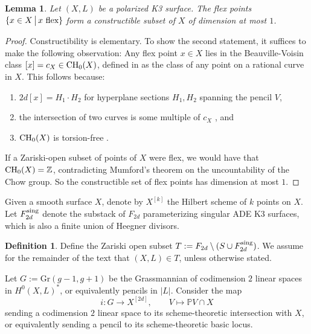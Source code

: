 \documentclass{amsart}
\newtheorem{lemma}[theorem]{Lemma}
\theoremstyle{definition}
\newtheorem{definition}[theorem]{Definition}
\newcommand{\Z}{\mathbb{Z}}
\begin{document}
\begin{lemma}\label{not-all-flex} Let $(X,L)$ be a polarized K3 surface.
The flex points $\{x\in X\,\big{|}\,x\textrm{ flex}\}$ form a constructible
subset of $X$ of dimension at most $1$.  \end{lemma}

\begin{proof} Constructibility is elementary. To show the second statement,
it suffices to make the following observation: Any flex point $x\in X$ lies in the
Beauville-Voisin class $[x]=c_X\in {\rm CH}_0(X)$, defined in \cite{beauville2004chow}
as the class of any point on a rational curve in $X$. This follows because:
\begin{enumerate} 
\item $2d[x]=H_1\cdot H_2$
for hyperplane sections $H_1, H_2$ spanning the pencil $V$,
\item the intersection of two curves is some multiple of $c_X$ \cite[Thm.~1]{beauville2004chow}, and 
\item ${\rm CH}_0(X)$ is torsion-free \cite{rojtman1980torsion}. 
\end{enumerate}
If a Zariski-open subset of points of $X$ were flex, we would have that ${\rm CH}_0(X)=\Z$,
contradicting Mumford's theorem \cite{mumford1969rational}
on the uncountability of the Chow group. So
the constructible set of flex points has dimension at most $1$. \end{proof}

Given a smooth surface $X$, denote by $X^{[k]}$ the Hilbert
scheme of $k$ points on $X$. Let $F_{2d}^{\rm sing}$ denote the substack of $F_{2d}$
parameterizing singular ADE K3 surfaces, which is also a finite
union of Heegner divisors.

\begin{definition} Define the Zariski open subset 
$T:=F_{2d}\setminus (S\cup F_{2d}^{\rm sing})$.
 We assume for the remainder of the text
 that $(X,L)\in T$, unless otherwise stated.\end{definition}

 
Let $G:=\textrm{Gr}(g-1,g+1)$
be the Grassmannian of codimension $2$ linear spaces in
$H^0(X, L)^*$,
or equivalently pencils in $|L|$. Consider the map
\begin{displaymath}
  i\colon G\to X^{[2d]},\qquad V\mapsto \mathbb PV\cap X
\end{displaymath}
sending a codimension
$2$ linear space to its scheme-theoretic intersection with $X$, or equivalently sending
a pencil to its scheme-theoretic basic locus.
\end{document}
